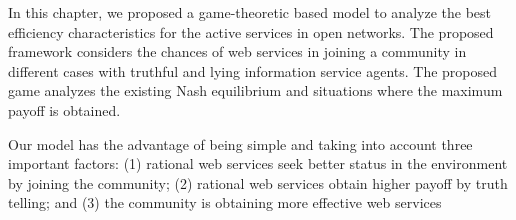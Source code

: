 In this chapter, we proposed a game-theoretic based model to analyze the best efficiency characteristics for the active services in open networks. The proposed framework considers the chances of web services in joining a community in different cases with truthful and lying information service agents. The proposed game analyzes the existing Nash equilibrium and situations where the maximum payoff is obtained.

Our model has the advantage of being simple and taking into account three important factors: (1) rational web services seek better status in the environment by joining the community; (2) rational web services obtain higher payoff by truth telling; and (3) the community is obtaining more effective web services
